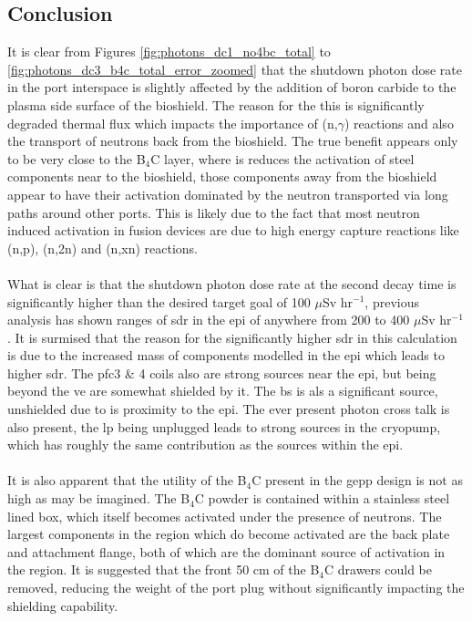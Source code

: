 \documentclass[12pt]{article}
\begin{document}
\subsection{Conclusion}
It is clear from Figures \ref{fig:photons_dc1_no4bc_total} to 
\ref{fig:photons_dc3_b4c_total_error_zoomed} that the shutdown photon dose rate 
in the port interspace is slightly affected by the addition of boron carbide 
to the plasma side surface of the bioshield. The reason for the this is 
significantly degraded thermal flux which impacts the importance of (n,$\gamma$)
 reactions and also the transport of neutrons back from the bioshield. The true 
benefit appears only to be very close to the B$_4$C layer, where is reduces the
activation of steel components near to the bioshield, those components away
from the bioshield appear to have their activation dominated by the neutron
transported via long paths around other ports. This is  likely due to the fact
that most neutron induced activation in fusion devices are due to high energy
capture reactions like (n,p), (n,2n) and (n,xn) reactions.
\\
\\
What is clear is that the shutdown photon dose rate at the second decay time is
significantly higher than the desired target goal of 100 $\mu$Sv hr$^{-1}$,
previous analysis has shown ranges of \gls{sdr} in the \gls{epi} of anywhere
from 200 to 400 $\mu$Sv hr$^{-1}$. It is surmised that the reason for the
significantly higher \gls{sdr} in this calculation is due to the increased
mass of components modelled in the \gls{epi} which leads to higher \gls{sdr}.
The \gls{pfc}3 \& 4 coils also are strong sources near the \gls{epi}, but being
beyond the \gls{ve} are somewhat shielded by it. The \gls{bs} is als a
significant source, unshielded due to is proximity to the \gls{epi}. The ever
present photon cross talk is also present, the \gls{lp} being unplugged leads
to strong sources in the cryopump, which has roughly the same contribution
as the sources within the \gls{epi}.
\\
\\
It is also apparent that the utility of the B$_4$C present in the \gls{gepp}
design is not as high as may be imagined. The B$_4$C powder is contained within
a stainless steel lined box, which itself becomes activated under the presence
of neutrons. The largest components in the region which do become activated are
the back plate and attachment flange, both of which are the dominant source of
activation in the region. It is suggested that the front 50 cm of the B$_4$C
drawers could be removed, reducing the weight of the port plug without
significantly impacting the shielding capability.
\newpage
\clearpage
\end{document}
